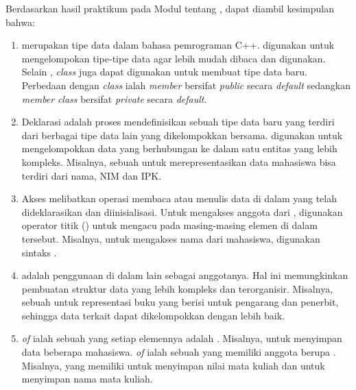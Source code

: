 \documentclass[../main.tex]{subfiles}
\begin{document}
    \ilz{}Berdasarkan hasil praktikum pada Modul {\thechapter} tentang {\leftmark}, dapat diambil kesimpulan bahwa:
    \begin{enumerate}
        \item {
            {\Struct} merupakan tipe data dalam bahasa pemrograman C++. {\Struct} digunakan untuk mengelompokan tipe-tipe data agar lebih mudah dibaca dan digunakan. Selain {\struct}, \textit{class} juga dapat digunakan untuk membuat tipe data baru. Perbedaan {\struct} dengan \textit{class} ialah \textit{member} {\struct} bersifat \textit{public} secara \textit{default} sedangkan \textit{member} \textit{class} bersifat \textit{private} secara \textit{default}.
        }
        \item {
            Deklarasi {\struct} adalah proses mendefinisikan sebuah tipe data baru yang terdiri dari berbagai tipe data lain yang dikelompokkan bersama. {\Struct} digunakan untuk mengelompokkan data yang berhubungan ke dalam satu entitas yang lebih kompleks. Misalnya, sebuah {\struct} untuk merepresentasikan data mahasiswa bisa terdiri dari nama, NIM dan IPK.
        }
        \item {
            Akses {\struct} melibatkan operasi membaca atau menulis data di dalam {\struct} yang telah dideklarasikan dan diinisialisasi. Untuk mengakses anggota dari {\struct}, digunakan operator titik () untuk mengacu pada masing-masing elemen di dalam {\struct} tersebut. Misalnya, untuk mengakses nama dari {\struct} mahasiswa, digunakan sintaks .
        }
        \item {
            {\Nested} {\struct} adalah penggunaan {\struct} di dalam {\struct} lain sebagai anggotanya. Hal ini memungkinkan pembuatan struktur data yang lebih kompleks dan terorganisir. Misalnya, sebuah {\struct} untuk representasi buku yang berisi {\struct} untuk pengarang dan penerbit, sehingga data terkait dapat dikelompokkan dengan lebih baik.
        }
        \item {
            {\sArray} \textit{of} {\struct} ialah sebuah {\sarray} yang setiap elemennya adalah {\struct}. Misalnya, {\sarray} untuk menyimpan data beberapa mahasiswa. {\Struct} \textit{of} {\sarray} ialah sebuah {\struct} yang memiliki anggota berupa {\sarray}. Misalnya, {\struct} yang memiliki {\sarray} untuk menyimpan nilai mata kuliah dan {\sarray} untuk menyimpan nama mata kuliah.
        }
    \end{enumerate}
\end{document}
